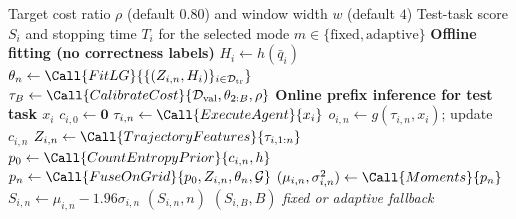 \begin{algorithm}[t]
\caption{BayesTraj fitting and inference}
\label{alg:bayestraj}
\footnotesize
\begin{algorithmic}
\Require Target cost ratio $\rho$ (default $0.80$) and window width $w$
(default $4$)
\Ensure Test-task score $S_i$ and stopping time $T_i$ for the selected mode
$m\in\{\mathrm{fixed},\mathrm{adaptive}\}$
\Statex \textbf{Offline fitting (no correctness labels)}
  \State $H_i\gets h(\bar q_i)$
\EndFor
{}
  \State $\theta_n\gets\Call{FitLG}
  {\{(Z_{i,n},H_i)\}_{i\in\mathcal D_{\mathrm{tr}}}}$
\EndFor
\State $\tau_B\gets\Call{CalibrateCost}
{\mathcal D_{\mathrm{val}},\theta_{2:B},\rho}$
\Statex \textbf{Online prefix inference for test task $x_i$}
\State $c_{i,0}\gets\mathbf 0$
  \State $\tau_{i,n}\gets\Call{ExecuteAgent}{x_i}$
  \State $o_{i,n}\gets g(\tau_{i,n},x_i)$; update $c_{i,n}$
    \State $Z_{i,n}\gets\Call{TrajectoryFeatures}{\tau_{i,1:n}}$
    \State $p_0\gets\Call{CountEntropyPrior}{c_{i,n},h}$
    \State $p_n\gets\Call{FuseOnGrid}{p_0,Z_{i,n},\theta_n,\mathcal G}$
    \State $(\mu_{i,n},\sigma_{i,n}^2)\gets\Call{Moments}{p_n}$
    \State $S_{i,n}\gets\mu_{i,n}-1.96\sigma_{i,n}$
        \State \Return $(S_{i,n},n)$
      \EndIf
    \EndIf
  \EndIf
\EndFor
\State \Return $(S_{i,B},B)$ \hfill\emph{fixed or adaptive fallback}
\end{algorithmic}
\end{algorithm}
